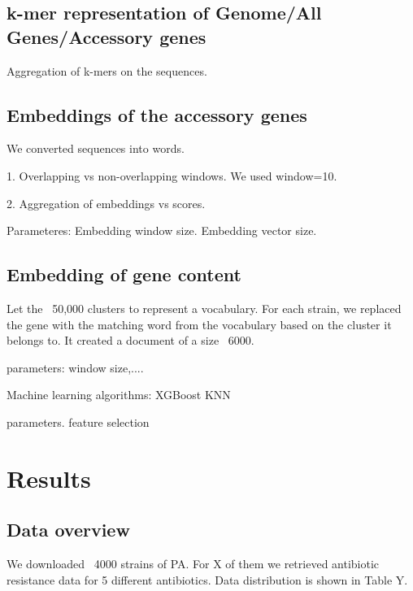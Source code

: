 \documentclass{bmcart}
\begin{document}



\subsection{k-mer representation of Genome/All Genes/Accessory genes}
Aggregation of k-mers on the sequences. 

\subsection{Embeddings  of the accessory genes}
We converted sequences into words.

1. Overlapping vs non-overlapping windows. We used window=10. 

2. Aggregation of embeddings vs scores.

Parameteres:
Embedding window size. Embedding vector size.

\subsection{Embedding of gene content}
Let the ~50,000 clusters to represent a vocabulary. 
For each strain, we replaced the gene with the matching word from the vocabulary based on the cluster it belongs to. It created a document of a size ~6000. 

parameters: window size,....

Machine learning algorithms:
XGBoost
KNN

parameters.
feature selection


\section{Results}

\subsection{Data overview}
We downloaded ~4000 strains of PA. For X of them we retrieved antibiotic resistance data for 5 different antibiotics. Data distribution is shown in Table Y. 
\end{document}
